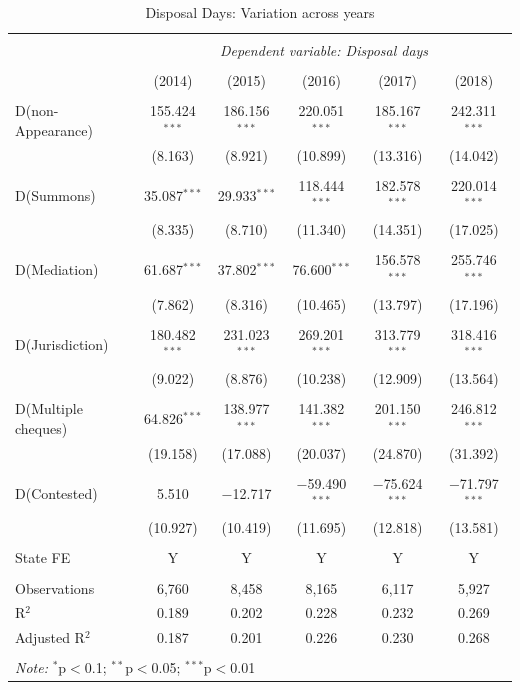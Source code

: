  \begin{longtable}{lcc|ccc} 
 \caption{Disposal Days: Variation across years}
 \\[-1.8ex]
 \hline \\[-1.8ex] 
 & \multicolumn{5}{c}{\textit{Dependent variable: Disposal days}} \\ 
 \cline{2-6} 
 \\[-1.8ex] & (2014) & (2015) & (2016) & (2017) & (2018)\\ 
 \hline \\[-1.8ex]
 
 D(non-Appearance) & 155.424$^{***}$ & 186.156$^{***}$ & 220.051$^{***}$ & 185.167$^{***}$ & 242.311$^{***}$ \\ 
 & (8.163) & (8.921) & (10.899) & (13.316) & (14.042) \\ 
 & & & & & \\ 
 D(Summons) & 35.087$^{***}$ & 29.933$^{***}$ & 118.444$^{***}$ & 182.578$^{***}$ & 220.014$^{***}$ \\ 
 & (8.335) & (8.710) & (11.340) & (14.351) & (17.025) \\ 
 & & & & & \\ 
 D(Mediation) & 61.687$^{***}$ & 37.802$^{***}$ & 76.600$^{***}$ & 156.578$^{***}$ & 255.746$^{***}$ \\ 
 & (7.862) & (8.316) & (10.465) & (13.797) & (17.196) \\ 
 & & & & & \\ 
 D(Jurisdiction) & 180.482$^{***}$ & 231.023$^{***}$ & 269.201$^{***}$ & 313.779$^{***}$ & 318.416$^{***}$ \\ 
 & (9.022) & (8.876) & (10.238) & (12.909) & (13.564) \\ 
 & & & & & \\ 
 D(Multiple cheques) & 64.826$^{***}$ & 138.977$^{***}$ & 141.382$^{***}$ & 201.150$^{***}$ & 246.812$^{***}$ \\ 
 & (19.158) & (17.088) & (20.037) & (24.870) & (31.392) \\ 
 & & & & & \\ 
 D(Contested) & 5.510 & $-$12.717 & $-$59.490$^{***}$ & $-$75.624$^{***}$ & $-$71.797$^{***}$ \\ 
 & (10.927) & (10.419) & (11.695) & (12.818) & (13.581) \\

 \hline \\[-1.8ex]
 State FE & Y & Y & Y & Y & Y \\
 \hline \\[-1.8ex] 
 
 Observations & 6,760 & 8,458 & 8,165 & 6,117 & 5,927 \\ 
 R$^{2}$ & 0.189 & 0.202 & 0.228 & 0.232 & 0.269 \\ 
 Adjusted R$^{2}$ & 0.187 & 0.201 & 0.226 & 0.230 & 0.268 \\
 
 \hline \\[-1.8ex] 
 \multicolumn{6}{l}{\textit{Note:} $^{*}$p$<$0.1; $^{**}$p$<$0.05; $^{***}$p$<$0.01} \\
\end{longtable}

